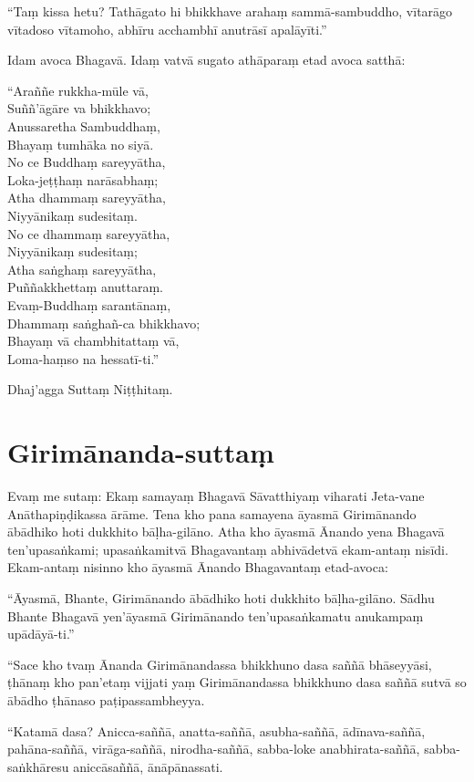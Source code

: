“Taṃ kissa hetu? Tathāgato hi bhikkhave arahaṃ sammā-sambuddho, vītarāgo
vītadoso vītamoho, abhīru acchambhī anutrāsī apalāyīti.”

Idam avoca Bhagavā. Idaṃ vatvā sugato athāparaṃ etad avoca satthā:

“Araññe rukkha-mūle vā,\\
Suññ’āgāre va bhikkhavo;\\
Anussaretha Sambuddhaṃ,\\
Bhayaṃ tumhāka no siyā.\\
No ce Buddhaṃ sareyyātha,\\
Loka-jeṭṭhaṃ narāsabhaṃ;\\
Atha dhammaṃ sareyyātha,\\
Niyyānikaṃ sudesitaṃ.\\
No ce dhammaṃ sareyyātha,\\
Niyyānikaṃ sudesitaṃ;\\
Atha saṅghaṃ sareyyātha,\\
Puññakkhettaṃ anuttaraṃ.\\
Evaṃ-Buddhaṃ sarantānaṃ,\\
Dhammaṃ saṅghañ-ca bhikkhavo;\\
Bhayaṃ vā chambhitattaṃ vā,\\
Loma-haṃso na hessatī-ti.”

Dhaj’agga Suttaṃ Niṭṭhitaṃ.


\section{Girimānanda-suttaṃ}


Evaṃ me sutaṃ: Ekaṃ samayaṃ Bhagavā Sāvatthiyaṃ viharati Jeta-vane
Anāthapiṇḍikassa ārāme. Tena kho pana samayena āyasmā Girimānando ābādhiko hoti
dukkhito bāḷha-gilāno. Atha kho āyasmā Ānando yena Bhagavā ten’upasaṅkami;
upasaṅkamitvā Bhagavantaṃ abhivādetvā ekam-antaṃ nisīdi. Ekam-antaṃ nisinno kho
āyasmā Ānando Bhagavantaṃ etad-avoca:

“Āyasmā, Bhante, Girimānando ābādhiko hoti dukkhito bāḷha-gilāno. Sādhu Bhante
Bhagavā yen’āyasmā Girimānando ten’upasaṅkamatu anukampaṃ upādāyā-ti.”

“Sace kho tvaṃ Ānanda Girimānandassa bhikkhuno dasa saññā bhāseyyāsi, ṭhānaṃ kho
pan’etaṃ vijjati yaṃ Girimānandassa bhikkhuno dasa saññā sutvā so ābādho ṭhānaso
paṭipassambheyya.

“Katamā dasa? Anicca-saññā, anatta-saññā, asubha-saññā, ādīnava-saññā,
pahāna-saññā, virāga-saññā, nirodha-saññā, sabba-loke anabhirata-saññā,
sabba-saṅkhāresu aniccāsaññā, ānāpānassati.

